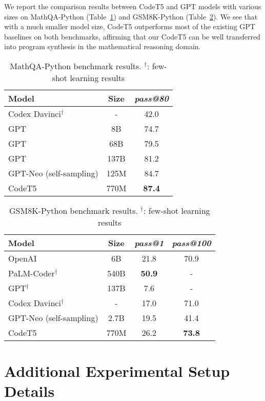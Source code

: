 \documentclass{article}
\begin{document}
We report the comparison results between CodeT5 and GPT models with various sizes  on  MathQA-Python (Table~\ref{tab:codet5_mathqa}) and GSM8K-Python (Table~\ref{tab:codet5_gsm}). We see that with a much smaller model size, CodeT5 outperforms most of the existing GPT baselines on both benchmarks, affirming that our CodeT5 can be well transferred into program synthesis in the mathematical reasoning domain.
\begin{table}[t] \centering
\caption{MathQA-Python benchmark results. $^{\dag}$: few-shot learning results}
\label{tab:codet5_mathqa}
\begin{tabular}{lc|c}
\hline
Model & Size & \emph{pass@80} \\
\hline
Codex Davinci$^{\dag}$  & - & 42.0 \\
GPT & 8B & 74.7 \\
GPT & 68B & 79.5 \\
GPT & 137B & 81.2 \\
GPT-Neo (self-sampling) & 125M & 84.7 \\
\hline
CodeT5 & 770M & \textbf{87.4} \\
\hline
\end{tabular}
\end{table} \begin{table}[t] \centering
\caption{GSM8K-Python benchmark results. $^{\dag}$: few-shot learning results}
\label{tab:codet5_gsm}
\begin{tabular}{lc|cc}
\hline
Model & Size & \emph{pass@1} & \emph{pass@100} \\
\hline
OpenAI & 6B & 21.8 & 70.9 \\
PaLM-Coder$^{\dag}$ & 540B & \textbf{50.9} & - \\
GPT$^{\dag}$ & 137B & 7.6 & - \\
Codex Davinci$^{\dag}$  & - & 17.0 & 71.0 \\
GPT-Neo (self-sampling) & 2.7B & 19.5 & 41.4 \\
\hline
CodeT5 & 770M & 26.2 & \textbf{73.8} \\
\hline
\end{tabular}
\end{table} \fi

\iffalse

\section{Additional Experimental Setup Details}
\label{app:training_info}
\end{document}

